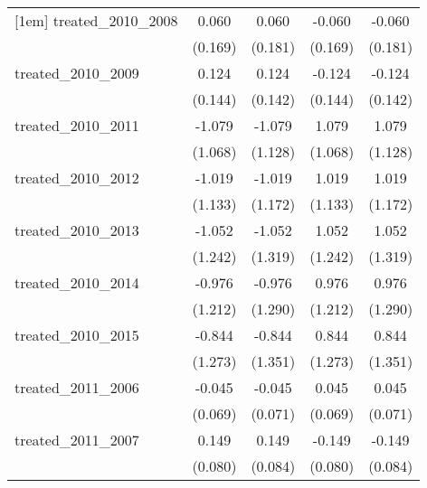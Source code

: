 {\begin{tabular}{l*{4}{c}}
[1em]
treated\_2010\_2008&       0.060         &       0.060         &      -0.060         &      -0.060         \\
            &     (0.169)         &     (0.181)         &     (0.169)         &     (0.181)         \\
[1em]
treated\_2010\_2009&       0.124         &       0.124         &      -0.124         &      -0.124         \\
            &     (0.144)         &     (0.142)         &     (0.144)         &     (0.142)         \\
[1em]
treated\_2010\_2011&      -1.079         &      -1.079         &       1.079         &       1.079         \\
            &     (1.068)         &     (1.128)         &     (1.068)         &     (1.128)         \\
[1em]
treated\_2010\_2012&      -1.019         &      -1.019         &       1.019         &       1.019         \\
            &     (1.133)         &     (1.172)         &     (1.133)         &     (1.172)         \\
[1em]
treated\_2010\_2013&      -1.052         &      -1.052         &       1.052         &       1.052         \\
            &     (1.242)         &     (1.319)         &     (1.242)         &     (1.319)         \\
[1em]
treated\_2010\_2014&      -0.976         &      -0.976         &       0.976         &       0.976         \\
            &     (1.212)         &     (1.290)         &     (1.212)         &     (1.290)         \\
[1em]
treated\_2010\_2015&      -0.844         &      -0.844         &       0.844         &       0.844         \\
            &     (1.273)         &     (1.351)         &     (1.273)         &     (1.351)         \\
[1em]
treated\_2011\_2006&      -0.045         &      -0.045         &       0.045         &       0.045         \\
            &     (0.069)         &     (0.071)         &     (0.069)         &     (0.071)         \\
[1em]
treated\_2011\_2007&       0.149         &       0.149         &      -0.149         &      -0.149         \\
            &     (0.080)         &     (0.084)         &     (0.080)         &     (0.084)         \\

\end{tabular}}
